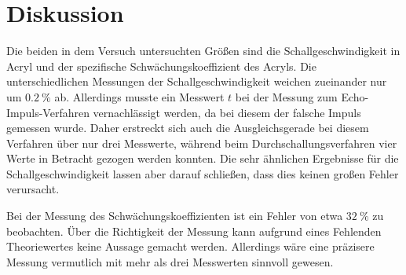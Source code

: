 \section{Diskussion}
\label{sec:Diskussion}


Die beiden in dem Versuch untersuchten Größen sind die Schallgeschwindigkeit in Acryl und der spezifische Schwächungskoeffizient 
des Acryls. Die unterschiedlichen Messungen der Schallgeschwindigkeit weichen zueinander nur um $\SI{0.2}{\percent} $ ab. 
Allerdings musste ein Messwert $t$ bei der Messung zum Echo-Impuls-Verfahren vernachlässigt werden, da bei diesem der falsche 
Impuls gemessen wurde. Daher erstreckt sich auch die Ausgleichsgerade bei diesem Verfahren über nur drei Messwerte, während 
beim Durchschallungsverfahren vier Werte in Betracht gezogen werden konnten. Die sehr ähnlichen Ergebnisse für die Schallgeschwindigkeit
lassen aber darauf schließen, dass dies keinen großen Fehler verursacht. 

Bei der Messung des Schwächungskoeffizienten ist ein Fehler von etwa $\SI{32}{\percent} $ zu beobachten. Über die Richtigkeit der 
Messung kann aufgrund eines Fehlenden Theoriewertes keine Aussage gemacht werden. Allerdings wäre eine präzisere Messung vermutlich 
mit mehr als drei Messwerten sinnvoll gewesen. 
